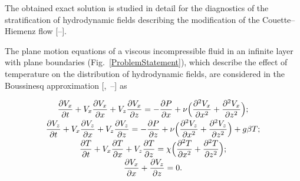 The obtained exact solution is studied in detail for the diagnostics of the stratification of hydrodynamic fields describing the modification of the Couette--Hiemenz flow [--].



\smallskip






The plane motion equations of a viscous incompressible fluid in an infinite layer with plane boundaries (Fig.~\ref{ProblemStatement}), which describe the effect of temperature on the distribution of hydrodynamic fields, are considered in the Boussinesq approximation [,~--] as

\begin{equation}

       \label{eq:VVP_EYP:Oberbek_system}

\begin{array}{c}

\displaystyle

\frac{\partial V_x}{\partial t} + V_x \frac{\partial V_x}{\partial x} + V_z \frac{\partial V_x}{\partial z}=-\frac{\partial P}{\partial x}+\nu \Bigl(\frac{\partial^2 V_{x}}{\partial x^2}+\frac{\partial^2 V_{x}}{\partial z^2}\Bigr);

\\[2mm]

\displaystyle

      \frac{\partial V_z}{\partial t} + V_x \frac{\partial V_z}{\partial x} + V_z \frac{\partial V_z}{\partial z}=-\frac{\partial P}{\partial z}+\nu \Bigl(\frac{\partial^2 V_{z}}{\partial x^2}+\frac{\partial^2 V_{z}}{\partial z^2}\Bigr)+g\beta T;

\\[2mm]

\displaystyle

\frac{\partial T}{\partial t} + V_x \frac{\partial T}{\partial x} + V_z \frac{\partial T}{\partial z}=\chi \Bigl(\frac{\partial^2 T}{\partial x^2}+\frac{\partial^2 T}{\partial z^2}\Bigr);

\\[2mm]

\displaystyle

\frac{\partial V_x }{\partial x}+\frac{\partial V_z}{\partial z}=0.

\end{array}

 \end{equation}

